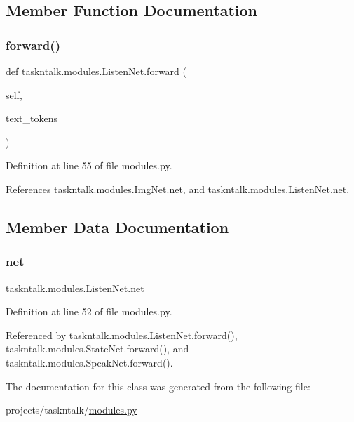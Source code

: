 \subsection{Member Function Documentation}
\mbox{\label{classtaskntalk_1_1modules_1_1ListenNet_a5409dc9b3f02d6a4fc6046dcdfa4122e}} 
\subsubsection{\texorpdfstring{forward()}{forward()}}
{\footnotesize\ttfamily def taskntalk.\+modules.\+Listen\+Net.\+forward (\begin{DoxyParamCaption}\item[{}]{self,  }\item[{}]{text\+\_\+tokens }\end{DoxyParamCaption})}



Definition at line 55 of file modules.\+py.



References taskntalk.\+modules.\+Img\+Net.\+net, and taskntalk.\+modules.\+Listen\+Net.\+net.



\subsection{Member Data Documentation}
\mbox{\label{classtaskntalk_1_1modules_1_1ListenNet_a6c6adcc5e789fa48715cd8754b3cb28e}} 
\subsubsection{\texorpdfstring{net}{net}}
{\footnotesize\ttfamily taskntalk.\+modules.\+Listen\+Net.\+net}



Definition at line 52 of file modules.\+py.



Referenced by taskntalk.\+modules.\+Listen\+Net.\+forward(), taskntalk.\+modules.\+State\+Net.\+forward(), and taskntalk.\+modules.\+Speak\+Net.\+forward().



The documentation for this class was generated from the following file\+:\begin{DoxyCompactItemize}
\item 
projects/taskntalk/\hyperlink{projects_2taskntalk_2modules_8py}{modules.\+py}\end{DoxyCompactItemize}
